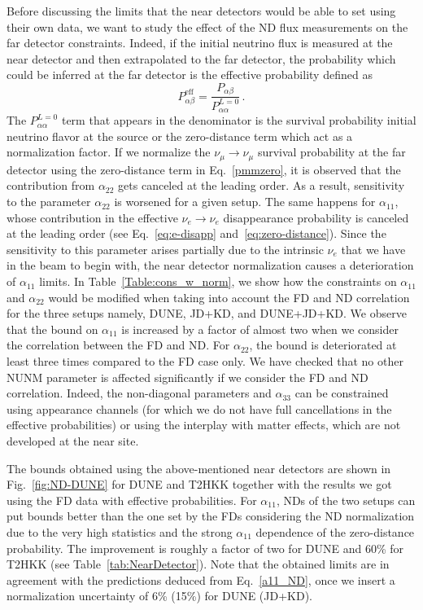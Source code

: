 \documentclass[11pt,a4paper]{article}
\newcommand{\aee}{\ensuremath{\alpha_{11}}}
\newcommand{\amm}{\ensuremath{\alpha_{22}}}
\begin{document}
 Before discussing the limits that the near detectors would be able to set using their own data, we want to study the effect of the ND flux measurements on the far detector constraints. Indeed, if the initial neutrino flux is measured at the near detector and then extrapolated to the far detector, the probability which could be inferred at the far detector is the effective probability defined as
	\begin{equation}
		P^{\text{eff}}_{\alpha\beta} = \frac{P_{\alpha\beta}}{P^{L=0}_{\alpha\alpha}}\,.
		\label{eq:eff_prob}
	\end{equation}
The $P^{L=0}_{\alpha\alpha}$ term that appears in the denominator is the survival probability initial neutrino flavor at the source or the zero-distance term which act as a normalization factor. If we normalize the $\nu_\mu\to\nu_\mu$ survival probability at the far detector using the zero-distance term in Eq.~\ref{pmmzero}, it is observed that the contribution from $\alpha_{22}$ gets canceled at the leading order. As a result, sensitivity to the parameter $\alpha_{22}$ is worsened for a given setup.
The same happens for $\alpha_{11}$, whose contribution in the effective $\nu_e\to\nu_e$ disappearance probability is canceled at the leading order (see Eq.~\ref{eq:e-disapp} and~\ref{eq:zero-distance}). Since the sensitivity to this parameter arises partially due to the intrinsic $\nu_e$ that we have in the beam to begin with, the near detector normalization causes a deterioration of $\alpha_{11}$ limits.
In Table~\ref{Table:cons_w_norm}, we show how the constraints on $\aee$ and $\amm$ would be modified when taking into account the FD and ND correlation for the three setups namely, DUNE, JD+KD, and DUNE+JD+KD. We observe that the bound on $\aee$ is increased by a factor of almost two when we consider the correlation between the FD and ND. For $\amm$, the bound is deteriorated at least three times compared to the FD case only. We have checked that no other NUNM parameter is affected significantly if we consider the FD and ND correlation. Indeed, the non-diagonal parameters and $\alpha_{33}$ can be constrained using appearance channels (for which we do not have full cancellations in the effective probabilities) or using the interplay with matter effects, which are not developed at the near site. 
 
The bounds obtained using the above-mentioned near detectors are shown in Fig.~\ref{fig:ND-DUNE} for DUNE and T2HKK together with the results we got using the FD data with effective probabilities. For $\alpha_{11}$, NDs of the two setups can put bounds better than the one set by the FDs considering the ND normalization due to the very high statistics and the strong $\alpha_{11}$ dependence of the zero-distance probability. The improvement is roughly a factor of two for DUNE and 60\% for T2HKK (see Table~\ref{tab:NearDetector}). Note that the obtained limits are in agreement with the predictions deduced from Eq.~\ref{a11_ND}, once we insert a normalization uncertainty of 6\% (15\%) for DUNE (JD+KD).  
\end{document}
